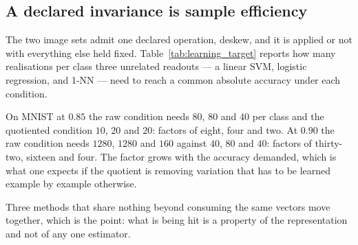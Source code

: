 \documentclass[10pt]{article}
\theoremstyle{plain}
\theoremstyle{definition}
\theoremstyle{remark}
\newcommand{\fitwidth}[1]{%
  \resizebox{\ifdim\width>\linewidth\linewidth\else\width\fi}{!}{#1}}
\begin{document}
\begin{table}[!htbp]\centering\small
\fitwidth{}
\caption{\small Exemplars per class required to reach a demanded $F_1$ under
the one-class rule at a single global $\tau$, and the ceiling of that rule. A
dash means the demanded $F_1$ is above that ceiling, which is given in the last
column; it is a limit of a rule that must answer without comparing, at this
pool size, and not a limit of the phenomenon.}
\label{tab:operating}
\end{table}

\begin{table}[!htbp]\centering\small
\fitwidth{}
\caption{\small At the $\tau$ maximising one-class $F_1$. Set coverage is how
often the true class is among the candidates; the gap between it and
forced-choice accuracy is the room a decision rule has.}
\label{tab:decision}
\end{table}

\subsection{A declared invariance is sample efficiency}

The two image sets admit one declared operation, deskew, and it is applied or
not with everything else held fixed. Table~\ref{tab:learning_target} reports
how many realisations per class three unrelated readouts --- a linear SVM,
logistic regression, and 1-NN --- need to reach a common absolute accuracy
under each condition.

On MNIST at $0.85$ the raw condition needs $80$, $80$ and $40$ per class and
the quotiented condition $10$, $20$ and $20$: factors of eight, four and two.
At $0.90$ the raw condition needs $1280$, $1280$ and $160$ against $40$, $80$
and $40$: factors of thirty-two, sixteen and four. The factor grows with the
accuracy demanded, which is what one expects if the quotient is removing
variation that has to be learned example by example otherwise.

Three methods that share nothing beyond consuming the same vectors move
together, which is the point: what is being hit is a property of the
representation and not of any one estimator.

\begin{table}[!htbp]\centering\small
\fitwidth{}
\caption{\small Realisations per class needed to reach a common absolute
accuracy. Comparable across quotients, which the knee table
(Table~\ref{tab:learning}) is not. The spoken set has no deskew row: deskew
acts on image axes and a log-mel spectrogram has none.}
\label{tab:learning_target}
\end{table}
\end{document}
